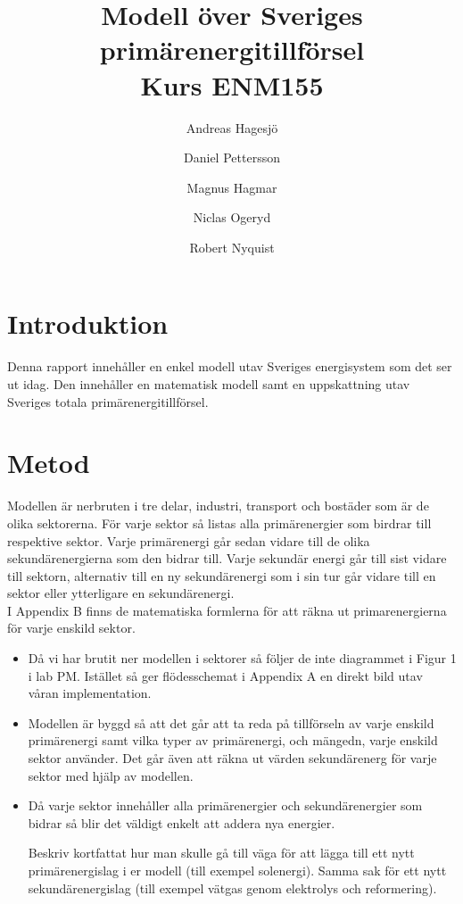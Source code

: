 \documentclass[a4paper,11pt,fleqn]{article}
\author{Andreas Hagesjö \and Daniel Pettersson \and
Magnus Hagmar \and Niclas Ogeryd \and Robert Nyquist}
\title{Modell över Sveriges primärenergitillförsel \\ Kurs ENM155}
\begin{document}
\maketitle
\newpage
{} 

\section{Introduktion}
Denna rapport innehåller en enkel modell utav Sveriges energisystem som det ser ut idag.
Den innehåller en matematisk modell samt en uppskattning utav Sveriges totala primärenergitillförsel.


\section{Metod}
Modellen är nerbruten i tre delar, industri, transport och bostäder som är de olika sektorerna.
För varje sektor så listas alla primärenergier som birdrar till respektive sektor. Varje primärenergi går sedan vidare till de olika sekundärenergierna som den bidrar till. Varje sekundär energi går till sist vidare till sektorn, alternativ till en ny sekundärenergi som i sin tur går vidare till en sektor eller ytterligare en sekundärenergi. \\
I Appendix B finns de matematiska formlerna för att räkna ut primarenergierna för varje enskild sektor.


\begin{itemize}
\item Då vi har brutit ner modellen i sektorer så följer de inte diagrammet i Figur 1 i lab PM.
Istället så ger flödesschemat i Appendix A en direkt bild utav våran implementation.


\item Modellen är byggd så att det går att ta reda på tillförseln av varje enskild primärenergi samt vilka typer av primärenergi, och mängedn, varje enskild sektor använder.
Det går även att räkna ut värden sekundärenerg för varje sektor med hjälp av modellen.

\item Då varje sektor innehåller alla primärenergier och sekundärenergier som bidrar så blir det väldigt enkelt att addera nya energier.

Beskriv kortfattat hur man skulle gå till väga för att lägga till ett
nytt primärenergislag i er modell (till exempel solenergi). Samma sak för
ett nytt sekundärenergislag (till exempel vätgas genom elektrolys och
reformering).
\end{itemize}
\end{document}
